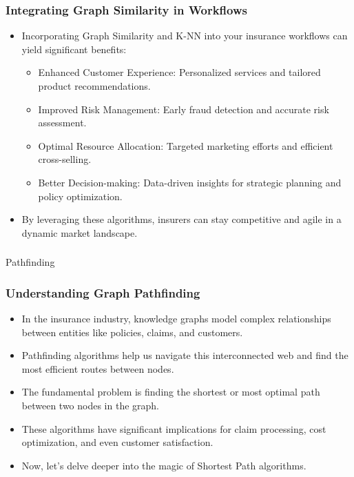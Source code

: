 \begin{frame}[fragile]\frametitle{Integrating Graph Similarity in Workflows}
\begin{itemize}
\item Incorporating Graph Similarity and K-NN into your insurance workflows can yield significant benefits:
\begin{itemize}
\item Enhanced Customer Experience: Personalized services and tailored product recommendations.
\item Improved Risk Management: Early fraud detection and accurate risk assessment.
\item Optimal Resource Allocation: Targeted marketing efforts and efficient cross-selling.
\item Better Decision-making: Data-driven insights for strategic planning and policy optimization.
\end{itemize}
\item By leveraging these algorithms, insurers can stay competitive and agile in a dynamic market landscape.
\end{itemize}
\end{frame}

\begin{frame}[fragile]\frametitle{}
\begin{center}
{\Large Pathfinding}
\end{center}
\end{frame}

\begin{frame}[fragile]\frametitle{Understanding Graph Pathfinding}
\begin{itemize}
\item In the insurance industry, knowledge graphs model complex relationships between entities like policies, claims, and customers.
\item Pathfinding algorithms help us navigate this interconnected web and find the most efficient routes between nodes.
\item The fundamental problem is finding the shortest or most optimal path between two nodes in the graph.
\item These algorithms have significant implications for claim processing, cost optimization, and even customer satisfaction.
\item Now, let's delve deeper into the magic of Shortest Path algorithms.
\end{itemize}
\end{frame}

